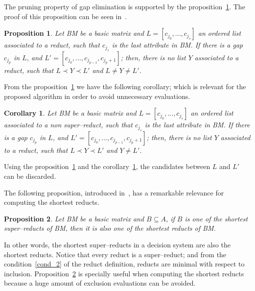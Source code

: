 \documentclass[authoryear,preprint,review,12pt]{elsarticle}
\newtheorem{proposition}{Proposition}
\newtheorem{corollary}{Corollary}
\begin{document}
	The pruning property of gap elimination is supported by the proposition~\ref{prop:gap}. The proof of this proposition can be seen in~\citep{Rodriguez2018}. 
			
	\begin{proposition}\label{prop:gap} 
		Let BM be a basic matrix and $L = [c_{j_0},...,c_{j_s}]$ an ordered list associated to a reduct, such that $c_{j_s}$ is the last attribute in BM. If there is a gap $c_{j_p}$ in $L$, and $L'=[c_{j_0},\dots,c_{j_{p-1}},c_{j_p+1}]$; then, there is no list $Y$ associated to a reduct, such that $L \prec Y \prec L'$ and $L \neq Y \neq L'$.
	\end{proposition}	
		
	From the proposition~\ref{prop:gap} we have the following corollary; which is relevant for the proposed algorithm in order to avoid unnecessary evaluations.
	
	\begin{corollary}\label{coro:gap} 
		Let BM be a basic matrix and $L = [c_{j_0},...,c_{j_s}]$ an ordered list associated to a non super--reduct, such that $c_{j_s}$ is the last attribute in BM. If there is a gap $c_{j_p}$ in $L$, and $L' = [c_{j_0},...,c_{j_{p-1}},c_{j_p+1}]$; then, there is no list $Y$ associated to a reduct, such that $L \prec Y \prec L'$ and $Y \neq L'$.
	\end{corollary}
	
	Using the proposition~\ref{prop:gap} and the corollary~\ref{coro:gap}, the candidates between $L$ and $L'$ can be discarded.
	
	The following proposition, introduced in~\citep{Zhou2009}, has a remarkable relevance for computing the shortest reducts.
	
	\begin{proposition}\label{prop:sr} 
		Let BM be a basic matrix and $B \subseteq A$, if $B$ is one of the shortest super--reducts of BM, then it is also one of the shortest reducts of BM.
	\end{proposition}	
	
	In other words, the shortest super--reducts in a decision system are also the shortest reducts. 
	Notice that every reduct is a super--reduct; and from the condition~\ref{cond_2} of the reduct definition, reducts are minimal with respect to inclusion. 
	Proposition~\ref{prop:sr} is specially useful when computing the shortest reducts because a huge amount of exclusion evaluations can be avoided.
	
\end{document}
